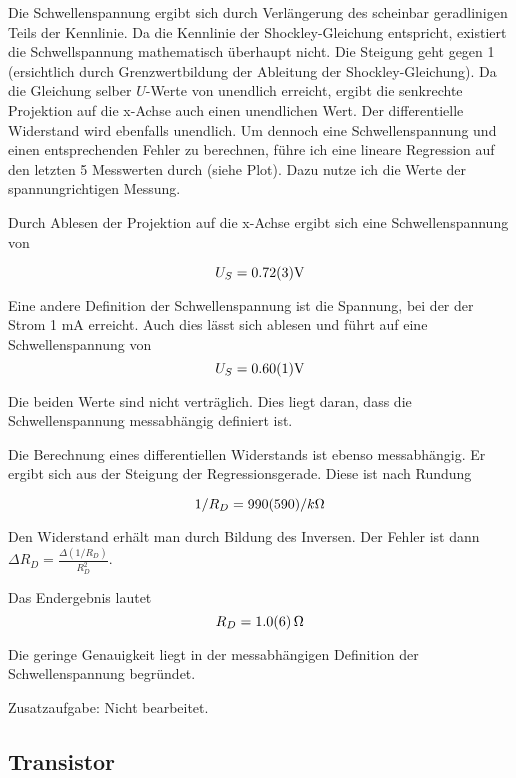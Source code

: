 \documentclass[a4paper,german,12pt,smallheadings]{scrartcl}
\begin{document}
Die Schwellenspannung ergibt sich durch Verlängerung des scheinbar geradlinigen
Teils der Kennlinie. Da die Kennlinie der Shockley-Gleichung entspricht,
existiert die Schwellspannung mathematisch überhaupt nicht. Die Steigung geht
gegen 1 (ersichtlich durch Grenzwertbildung der Ableitung der
Shockley-Gleichung). Da die Gleichung selber $U$-Werte von unendlich erreicht,
ergibt die senkrechte Projektion auf die x-Achse auch einen unendlichen Wert.
Der differentielle Widerstand wird ebenfalls unendlich. Um dennoch eine
Schwellenspannung und einen entsprechenden Fehler zu berechnen, führe ich eine
lineare Regression auf den letzten 5 Messwerten durch (siehe Plot). Dazu nutze
ich die Werte der spannungrichtigen Messung.

Durch Ablesen der Projektion auf die x-Achse ergibt sich eine Schwellenspannung
von

\begin{equation}
  U_S = \num{0.72+-0.03} \text{V}
\end{equation}

Eine andere Definition der Schwellenspannung ist die Spannung, bei der der
Strom 1 mA erreicht. Auch dies lässt sich ablesen und führt auf eine
Schwellenspannung von
\begin{equation}
  U_S = \num{0.60\pm0.01} \text{V}
\end{equation}

Die beiden Werte sind nicht verträglich. Dies liegt daran, dass die
Schwellenspannung messabhängig definiert ist.

Die Berechnung eines differentiellen Widerstands ist ebenso messabhängig. Er
ergibt sich aus der Steigung der Regressionsgerade. Diese ist nach Rundung

\begin{equation}
  1/R_D = \num{990\pm590} / k \Omega
\end{equation}

Den Widerstand erhält man durch Bildung des Inversen. Der Fehler ist dann
$\Delta R_D = \frac{\Delta(1/R_D)}{R_D^2}$.

Das Endergebnis lautet
\begin{equation}
  R_D = \num{1.0+-0.6} \,\Omega
\end{equation}

Die geringe Genauigkeit liegt in der messabhängigen Definition der
Schwellenspannung begründet.

Zusatzaufgabe: Nicht bearbeitet.

\subsection{Transistor}
\end{document}
